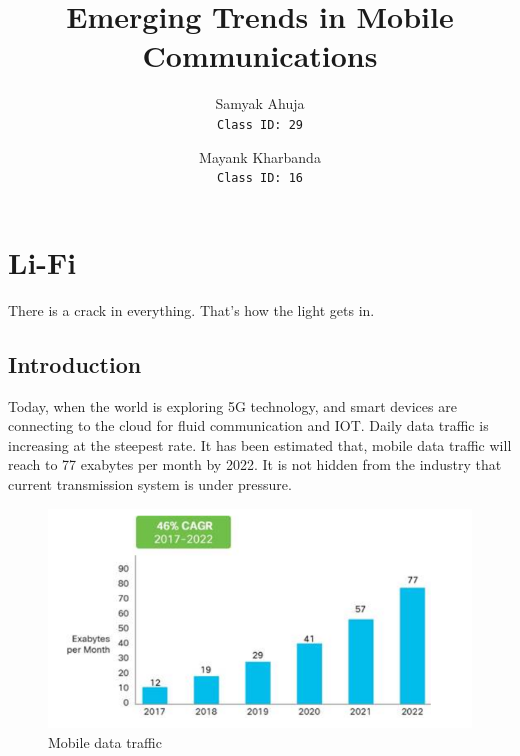 \documentclass{article}
\title{Emerging Trends in Mobile Communications}
\author{
    Samyak Ahuja \\
    \texttt{Class ID: 29}
    \and
    Mayank Kharbanda \\
    \texttt{Class ID: 16}
}
\begin{document}
\maketitle

\section{Li-Fi}
\epigraph{There is a crack in everything.
That's how the light gets in.}{\textcite{selected-poem}}
\subsection{Introduction}
Today, when the world is exploring 5G technology, and smart devices are connecting to the cloud for fluid communication and IOT. Daily data traffic is increasing at the steepest rate. It has been estimated that, mobile data traffic will reach to 77 exabytes per month by 2022. \cite{cisco} It is not hidden from the industry that current transmission system is under pressure.\\
\begin{figure}[!h]
  \includegraphics{res/traffic_trend_li_fi.PNG}
    \caption{Mobile data traffic}
  \label{fig:traffic_trend_li_fi}
\end{figure}
\end{document}
